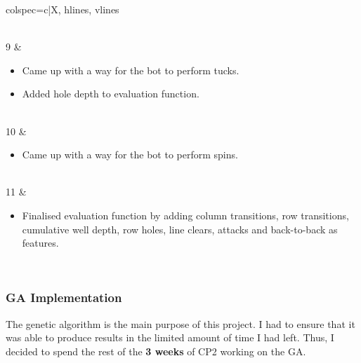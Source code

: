 \documentclass[a4paper, 12pt]{extreport}
\begin{document}
\begin{longtblr}[
				caption = Weekly breakdown of work done for the bot.
				]{colspec={c|X}, hlines, vlines}
\begin{varwidth}[t]{\linewidth}
				\end{varwidth}\\
				9 & \begin{varwidth}[t]{\linewidth}
					\begin{itemize}[topsep=0pt,parsep=0pt]
						\item Came up with a way for the bot to perform tucks.
						\item Added hole depth to evaluation function.
					\end{itemize}
				\end{varwidth}\\
				10 & \begin{varwidth}[t]{\linewidth}
					\begin{itemize}[topsep=0pt,parsep=0pt]
						\item Came up with a way for the bot to perform spins.
					\end{itemize}
				\end{varwidth}\\
				11 & \begin{varwidth}[t]{\linewidth}
					\begin{itemize}[topsep=0pt,parsep=0pt]
						\item Finalised evaluation function by adding column transitions, row transitions, cumulative well depth, row holes, line clears, attacks and back-to-back as features.
					\end{itemize}
				\end{varwidth}\\
			\end{longtblr}
		
		\subsubsection{GA Implementation}
		
			The genetic algorithm is the main purpose of this project. I had to ensure that it was able to produce results in the limited amount of time I had left. Thus, I decided to spend the rest of the \textbf{3 weeks} of CP2 working on the GA.
			
\end{document}
